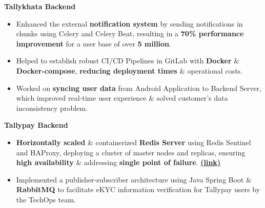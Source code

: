 \documentclass[10pt,a4paper,ragged2e,withhyper]{altacv}
\begin{document}
\textbf{Tallykhata Backend}
\begin{itemize}
\item Enhanced the external \textbf{notification system} by sending notifications in chunks using Celery and Celery Beat, resulting in a \textbf{70\% performance improvement} for a user base of over \textbf{5 million}.{\href{https://play.google.com/store/apps/details?id=com.progoti.tallykhata&hl=en}{\faLink}}
\item Helped to establish robust CI/CD Pipelines in GitLab with \textbf{Docker} \& \textbf{Docker-compose}, \textbf{reducing deployment times} \& operational costs.
\item Worked on \textbf{syncing user data} from Android Application to Backend Server, which improved real-time user experience \& solved customer's data inconsistency problem.
\end{itemize}

\textbf{Tallypay Backend}
\begin{itemize}
\item \textbf{Horizontally scaled} \& containerized \textbf{Redis Server} using Redis Sentinel and HAProxy, deploying a cluster of master nodes and replicas, ensuring \textbf{high availability} \& addressing \textbf{single point of failure}. \textbf{\href{https://github.com/akash-podder/Redis-Replication}{(link)}}
\item Implemented a publisher-subscriber architecture using Java Spring Boot \& \textbf{RabbitMQ} to facilitate eKYC information verification for Tallypay users by the TechOps team.
\end{itemize}

\divider
\end{document}

